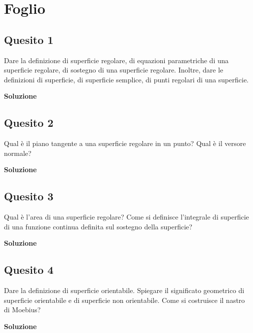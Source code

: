 \chapter{Foglio \ \thechapter}


\section*{Quesito 1}
Dare la definizione di superficie regolare, di equazioni parametriche di una
superficie regolare, di sostegno di una superficie regolare. Inoltre, dare le definizioni di
superficie, di superficie semplice, di punti regolari di una superficie.

\medskip
\begin{large}
\textbf{Soluzione}
\end{large}


\section*{Quesito 2}
Qual è il piano tangente a una superficie regolare in un punto? Qual è il
versore normale?


\medskip
\begin{large}
\textbf{Soluzione}
\end{large}


\section*{Quesito 3}
Qual è l’area di una superficie regolare? Come si definisce l’integrale di superficie di una funzione continua definita sul sostegno della superficie?


\medskip
\begin{large}
\textbf{Soluzione}
\end{large}


\section*{Quesito 4}
Dare la definizione di superficie orientabile. Spiegare il significato geometrico
di superficie orientabile e di superficie non orientabile. Come si costruisce il nastro di
Moebius?


\medskip
\begin{large}
\textbf{Soluzione}
\end{large}


